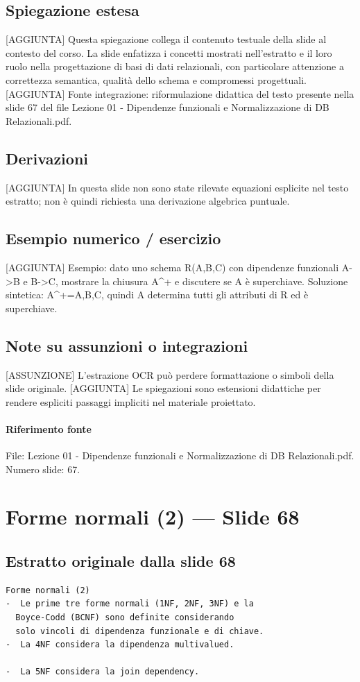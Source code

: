 \documentclass[11pt]{article}
\begin{document}
\subsection*{Spiegazione estesa}
[AGGIUNTA] Questa spiegazione collega il contenuto testuale della slide al contesto del corso. La slide enfatizza i concetti mostrati nell'estratto e il loro ruolo nella progettazione di basi di dati relazionali, con particolare attenzione a correttezza semantica, qualità dello schema e compromessi progettuali.
[AGGIUNTA] Fonte integrazione: riformulazione didattica del testo presente nella slide 67 del file Lezione 01 - Dipendenze funzionali e Normalizzazione di DB Relazionali.pdf.
\subsection*{Derivazioni}
[AGGIUNTA] In questa slide non sono state rilevate equazioni esplicite nel testo estratto; non è quindi richiesta una derivazione algebrica puntuale.
\subsection*{Esempio numerico / esercizio}
[AGGIUNTA] Esempio: dato uno schema R(A,B,C) con dipendenze funzionali A->B e B->C, mostrare la chiusura A^+ e discutere se A è superchiave. Soluzione sintetica: A^+={A,B,C}, quindi A determina tutti gli attributi di R ed è superchiave.
\subsection*{Note su assunzioni o integrazioni}
[ASSUNZIONE] L'estrazione OCR può perdere formattazione o simboli della slide originale.
[AGGIUNTA] Le spiegazioni sono estensioni didattiche per rendere espliciti passaggi impliciti nel materiale proiettato.
\paragraph{Riferimento fonte} File: Lezione 01 - Dipendenze funzionali e Normalizzazione di DB Relazionali.pdf. Numero slide: 67.
\section{Forme normali (2) --- Slide 68}
\subsection*{Estratto originale dalla slide 68}
\begin{lstlisting}
Forme normali (2)
-  Le prime tre forme normali (1NF, 2NF, 3NF) e la
  Boyce-Codd (BCNF) sono definite considerando
  solo vincoli di dipendenza funzionale e di chiave.
-  La 4NF considera la dipendenza multivalued.

-  La 5NF considera la join dependency.
\end{lstlisting}
\end{document}
